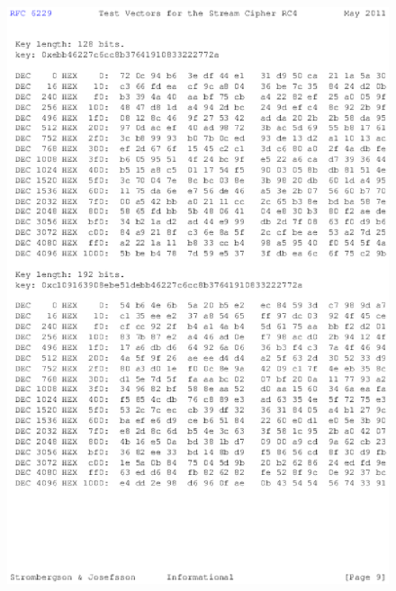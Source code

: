 \begin{anexosenv}
\begin{figure}
\centering
\includegraphics{figuras/file-8}
\end{figure}


\end{anexosenv}
